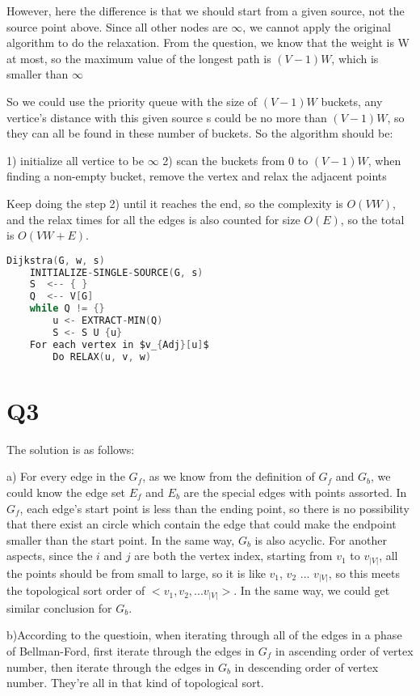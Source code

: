 \documentclass{article}
\begin{document}
However, here the difference is that we should start from a given source, not the source point above. Since all other
nodes are $\infty$, we cannot apply the original algorithm to do the relaxation. From the question, we know that the
weight is W at most, so the maximum value of the longest path is $(V-1)W$, which is smaller than $\infty$

So we could use the priority queue with the size of $(V-1)W$ buckets, any vertice's distance with this given source s
could be no more than $(V-1)W$, so they can all be found in these number of buckets. So the algorithm should be:

1) initialize all vertice to be $\infty$
2) scan the buckets from 0 to $(V-1)W$, when finding a non-empty bucket, remove the vertex and relax the adjacent points

Keep doing the step 2) until it reaches the end, so the complexity is $O(VW)$, and the relax times for all the edges
is also counted for size $O(E)$, so the total is $O(VW+E)$.


\begin{lstlisting}[language=C]
Dijkstra(G, w, s)
	INITIALIZE-SINGLE-SOURCE(G, s)
	S  <-- { }
	Q  <-- V[G]
	while Q != {}
		u <- EXTRACT-MIN(Q)
		S <- S U {u}
	For each vertex in $v_{Adj}[u]$
		Do RELAX(u, v, w) 

\end{lstlisting}

\section{Q3}

The solution is as follows:

a) For every edge in the $G_{f}$, as we know from the definition of $G_{f}$ and $G_{b}$, we could know the edge set $E_{f}$ and $E_{b}$ are the special edges with points assorted. In $G_{f}$, each edge's start point is less than the
ending point, so there is no possibility that there exist an circle which contain the edge that 
could make the endpoint smaller than the start point. In the same way, $G_{b}$ is also acyclic. For another aspects, since the $i$ and $j$ are both the vertex index,
starting from $v_{1}$ to $v_{|V|}$, all the points should be from small to large, so it is like $v_{1}$, $v_{2}$ ... $v_{|V|}$, so this meets the topological sort order of $<v_{1}, v_{2}, ... v_{|V|}>$. In the same way, we could get similar conclusion for $G_{b}$.


b)According to the questioin, when iterating through all of the edges in a phase of Bellman-Ford, first iterate through the edges in $G_{f}$ in ascending order of vertex number, then iterate through the edges in $G_{b}$ in descending order of vertex number. They're all in that kind of topological sort.
\end{document}
